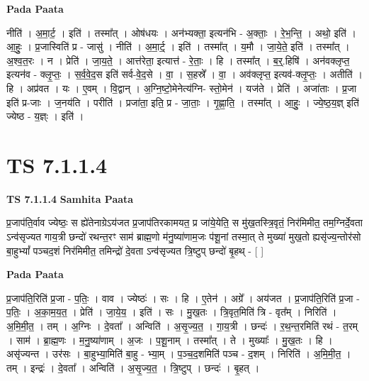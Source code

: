\documentclass[17pt]{extarticle}
\begin{document}
\textbf{Pada Paata} \newline

नीति॑ । अ॒मा॒र्ट॒ । इति॑ । तस्मा᳚त् । ओष॑धयः । अन॑भ्यक्ता॒ इत्यन॑भि - अ॒क्ताः॒ । रे॒भ॒न्ति॒ । अथो॒ इति॑ । आ॒हुः॒ । प्र॒जास्विति॑ प्र - जासु॑ । नीति॑ । अ॒मा॒र्ट्॒ । इति॑ । तस्मा᳚त् । य॒मौ । जा॒ये॒ते॒ इति॑ । तस्मा᳚त् । अ॒श्व॒त॒रः । न । प्रेति॑ । जा॒य॒ते॒ । आत्त॑रेता॒ इत्यात्त॑ - रे॒ताः॒ । हि । तस्मा᳚त् । ब॒र्॒.हिषि॑ । अन॑वक्लृप्त॒ इत्यन॑व - क्लृ॒प्तः॒ । स॒र्व॒वे॒द॒स इति॑ सर्व-वे॒द॒से । वा॒ । स॒हस्रे᳚ । वा॒ । अव॑क्लृप्त॒ इत्यव॑-क्लृ॒प्तः॒ । अतीति॑ । हि । अप्र॑वत । यः । ए॒वम् । वि॒द्वान् । अ॒ग्नि॒ष्टो॒मेनेत्य॑ग्नि- स्तो॒मेन॑ । यज॑ते । प्रेति॑ । अजा॑ताः । प्र॒जा इति॑ प्र-जाः । ज॒नय॑ति । परीति॑ । प्रजा॑ता॒ इति॒ प्र - जा॒ताः॒ । गृ॒ह्णा॒ति॒ । तस्मा᳚त् । आ॒हुः॒ । ज्ये॒ष्ठ॒य॒ज्ञ् इति॑ ज्येष्ठ - य॒ज्ञ्ः । इति॑ ।  \newline




\section*{ TS 7.1.1.4 }

\textbf{TS 7.1.1.4 } \newline
\textbf{Samhita Paata} \newline

प्र॒जाप॑ति॒र्वाव ज्येष्ठः॒ स ह्ये॑तेनाग्रेऽय॑जत प्र॒जाप॑तिरकामयत॒ प्र जा॑ये॒येति॒ स मु॑ख॒तस्त्रि॒वृतं॒ निर॑मिमीत॒ तम॒ग्निर्दे॒वता ऽन्व॑सृज्यत गाय॒त्री छन्दो॑ रथन्त॒रꣳ साम॑ ब्राह्म॒णो म॑नु॒ष्या॑णाम॒जः प॑शू॒नां तस्मा॒त् ते मुख्या॑ मुख॒तो ह्यसृ॑ज्य॒न्तोर॑सो बा॒हुभ्यां᳚ पञ्चद॒शं निर॑मिमीत॒ तमिन्द्रो॑ दे॒वता ऽन्व॑सृज्यत त्रि॒ष्टुप् छन्दो॑ बृ॒हथ् - [  ] \newline

\textbf{Pada Paata} \newline

प्र॒जाप॑ति॒रिति॑ प्र॒जा - प॒तिः॒ । वाव । ज्येष्ठः॑ । सः । हि । ए॒तेन॑ । अग्रे᳚ । अय॑जत । प्र॒जाप॑ति॒रिति॑ प्र॒जा - प॒तिः॒ । अ॒का॒म॒य॒त॒ । प्रेति॑ । जा॒ये॒य॒ । इति॑ । सः । मु॒ख॒तः । त्रि॒वृत॒मिति॑ त्रि - वृत᳚म् । निरिति॑ । अ॒मि॒मी॒त॒ । तम् । अ॒ग्निः । दे॒वता᳚ । अन्विति॑ । अ॒सृ॒ज्य॒त॒ । गा॒य॒त्री । छन्दः॑ । र॒थ॒न्त॒रमिति॑ रथं - त॒रम् । साम॑ । ब्रा॒ह्म॒णः । म॒नु॒ष्या॑णाम् । अ॒जः । प॒शू॒नाम् । तस्मा᳚त् । ते । मुख्याः᳚ । मु॒ख॒तः । हि । असृ॑ज्यन्त । उर॑सः । बा॒हुभ्या॒मिति॑ बा॒हु - भ्या॒म् । प॒ञ्च॒द॒शमिति॑ पञ्च - द॒शम् । निरिति॑ । अ॒मि॒मी॒त॒ । तम् । इन्द्रः॑ । दे॒वता᳚ । अन्विति॑ । अ॒सृ॒ज्य॒त॒ । त्रि॒ष्टुप् । छन्दः॑ । बृ॒हत् ।  \newline
\end{document}
